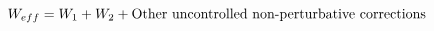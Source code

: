 \begin{equation} 
W_{eff} = W_1+W_2+\hbox{Other uncontrolled non-perturbative corrections}
\end{equation}

